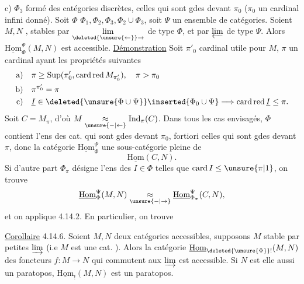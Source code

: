 c) $\Phi_3$  formé des catégories discrètes,  celles qui sont gdes devant $\pi_0$ ($\pi_0$ un cardinal infini donné). Soit $\Phi$   $\Phi_1,\Phi_2,\Phi_3,\Phi_2\cup\Phi_3$, \unsure{;} soit $\Psi$ un  ensemble de catégories. Soient $M,N$   , stables par $\underset{\deleted{\unsure{\gets}}\to}{\lim}$ de type $\Phi$, et par $\varprojlim$ de type $\Psi$. Alors  $\underline{\mathrm{Hom}}_\Phi^\Psi(M,N)$ est accessible.
\uline{Démonstration} Soit $\pi'_0$   cardinal utile pour $M$, $\pi$ un cardinal ayant les propriétés suivantes
\[
\begin{aligned}
\text{a)}\quad &\pi\geq\operatorname{Sup}(\pi'_0,\operatorname{card\,red}M_{\pi'_0}),\quad\pi>\pi_0\\
\text{b)}\quad &\pi^{\pi'_0}=\pi\\
\text{c)}\quad &\underline I\in\deleted{\unsure{\Phi\cup\Psi}}\inserted{\Phi_0\cup\Psi}\Longrightarrow
\operatorname{card\,red}\underline I\leq\pi .
\end{aligned}
\]
  Soit $C=M_\pi$, d'où $M\underset{\unsure{-|\leftarrow}}{\approx}\mathrm{Ind}_\pi(C)$. Dans tous les cas envisagés, $\Phi$ contient l'ens des cat.  qui sont gdes devant $\pi_0$,  fortiori celles qui sont gdes devant $\pi$, donc la catégorie $\underline{\mathrm{Hom}}_\Phi^\Psi$   une sous-catégorie  pleine de
\[
\underline{\mathrm{Hom}}(C,N).
\]
Si d'autre part $\Phi_\pi$ désigne l'ens des $I\in\Phi$ telles que $\operatorname{card} I\leq\unsure{\pi|1}$, on trouve
\[
\underline{\mathrm{Hom}}_\Phi^\Psi(M,N)\underset{\unsure{-|\to}}{\approx}
\underline{\mathrm{Hom}}_{\Phi_\pi}^\Psi(C,N),
\]
et on applique 4.14.2.
En particulier, on trouve

\uline{Corollaire} 4.14.6. Soient $M,N$ deux catégories accessibles, supposons $M$ stable par petites $\varinjlim$ (i.e $M$ est une cat. ). Alors la catégorie $\underline{\mathrm{Hom}}_{\deleted{\unsure{\Phi}}!}(M,N)$ des foncteurs $f:M\longrightarrow N$ qui commutent aux  $\varinjlim$ est accessible. Si $N$ est elle aussi un paratopos, $\underline{\mathrm{Hom}}_!(M,N)$ est un paratopos.

